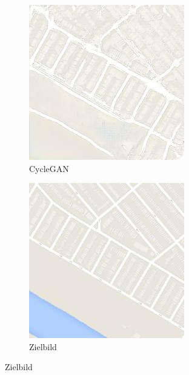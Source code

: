 \begin{figure}
\begin{subfigure}[t]{.2\textwidth}
	\end{subfigure}
	\begin{subfigure}[t]{.2\textwidth}
	  \caption*{CycleGAN}
	  \centering
	  \includegraphics[width=\linewidth]{images/cycleGanResults/Maps6Ld120_E100_Lr0002.jpg}
	\end{subfigure}
	\begin{subfigure}[t]{.2\textwidth}
	  \caption*{Zielbild}
	  \centering
	  \includegraphics[width=\linewidth]{images/cycleGanResults/Maps6_Or_Ld120_E100_Lr0002.jpg}
	\end{subfigure}
  

\end{figure}
